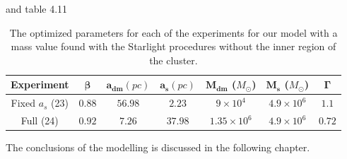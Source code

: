  and table 4.11

\begin{table}[H]
\begin{center}
\begin{tabular}{| c| c| c| c| c| c| c|}
    \hline
    \textbf{Experiment} & $\mathbf{\beta}$ & $\mathbf{a_{dm}} (pc)$ & $\mathbf{a_{s}} (pc)$ & $\mathbf{M_{dm}}$ ($M_{\odot}$) & $\mathbf{M_{s}}$ ($M_{\odot}$) & $\mathbf{\Gamma}$\\ \hline
	Fixed $a_s$ (23) &	$0.88$ &	$56.98$ &	$2.23$ &	$9 \times 10^{4}$ &	$4.9 \times 10 ^{6}$ &	$1.1$\\ \hline
	Full (24) &	$0.92$ &	$7.26$ &	$37.98$ &	$1.35 \times 10^{6}$ &	$4.9 \times 10^{6}$ &	$0.72$\\ \hline
  \end{tabular} 
\caption[Optimized parameters for our model with a mass value based on the Starlight procedures without the inner region.]{The optimized parameters for each of the experiments for our model with a mass value found with the Starlight procedures without the inner region of the cluster.}
\end{center}  
\end{table}

The conclusions of the modelling is discussed in the following chapter.